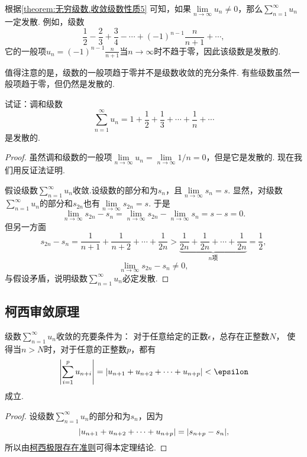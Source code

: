 根据\cref{theorem:无穷级数.收敛级数性质5} 可知，如果\(\lim\limits_{n\to\infty} u_n \neq 0\)，那么\(\sum\limits_{n=1}^\infty u_n\)一定发散.
例如，级数\[
\frac{1}{2}-\frac{2}{3}+\frac{3}{4}-\dotsb+(-1)^{n-1}\frac{n}{n+1}+\dotsb,
\]它的一般项\(u_n = (-1)^{n-1} \frac{n}{n+1}\)当\(n\to\infty\)时不趋于零，因此该级数是发散的.

值得注意的是，级数的一般项趋于零并不是级数收敛的充分条件.
有些级数虽然一般项趋于零，但仍然是发散的.
\begin{example}\label{example:无穷级数.调和级数的收敛性}
试证：调和级数\[
\sum\limits_{n=1}^\infty u_n = 1+\frac{1}{2}+\frac{1}{3}+\dotsb+\frac{1}{n}+\dotsb
\]是发散的.
\begin{proof}
虽然调和级数的一般项\(\lim\limits_{n\to\infty} u_n = \lim\limits_{n\to\infty} 1/n = 0\)，但是它是发散的.
现在我们用反证法证明.

假设级数\(\sum\limits_{n=1}^\infty u_n\)收敛.设级数的部分和为\(s_n\)，且\(\lim\limits_{n\to\infty} s_n = s\).
显然，对级数\(\sum\limits_{n=1}^\infty u_n\)的部分和\(s_{2n}\)也有\(\lim\limits_{n\to\infty} s_{2n} = s\).
于是\[
\lim\limits_{n\to\infty} {s_{2n}-s_n} = \lim\limits_{n\to\infty} s_{2n} - \lim\limits_{n\to\infty} s_n = s - s = 0.
\]但另一方面\[
s_{2n} - s_n = \frac{1}{n+1}+\frac{1}{n+2}+\dotsb+\frac{1}{2n}
> \underbrace{\frac{1}{2n}+\frac{1}{2n}+\dotsb+\frac{1}{2n}}_{n\text{项}}
= \frac{1}{2},
\]\[
\lim\limits_{n\to\infty} {s_{2n}-s_n} \neq 0,
\]与假设矛盾，说明级数\(\sum\limits_{n=1}^\infty u_n\)必定发散.
\end{proof}
\end{example}

\subsection{柯西审敛原理}
\begin{theorem}[柯西审敛原理]\label{theorem:无穷级数.级数的柯西审敛原理}
级数\(\sum\limits_{n=1}^\infty u_n\)收敛的充要条件为：
对于任意给定的正数\(\epsilon\)，总存在正整数\(N\)，
使得当\(n>N\)时，对于任意的正整数\(p\)，都有\[
\abs{ \sum\limits_{i=1}^p u_{n+i} }
= \abs{u_{n+1}+u_{n+2}+\dotsb+u_{n+p}}
< \epsilon
\]成立.
\begin{proof}
设级数\(\sum\limits_{n=1}^\infty u_n\)的部分和为\(s_n\)，因为\[
\abs{u_{n+1}+u_{n+2}+\dotsb+u_{n+p}} = \abs{s_{n+p}-s_n},
\]所以由\hyperref[theorem:极限.数列的柯西极限存在准则]{柯西极限存在准则}可得本定理结论.
\end{proof}
\end{theorem}

